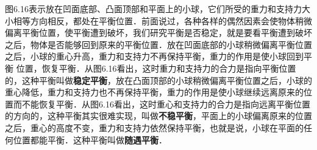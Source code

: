 图6.16表示放在凹面底部、凸面顶部和平面上的小球，它们所受的重力和支持力大小相等方向相反，都处在平衡位置．前面说过，各种各样的偶然因素会使物体稍微偏离平衡位置，使平衡遭到破坏，我们研究平衡是否稳定，就是要看平衡遭到破坏之后，物体是否能够回到原来的平衡位置．放在凹面底部的小球稍微偏离平衡位置之后，小球的重心升高，重力和支持力不再保持平衡，重力的作用是使小球回到平衡
位置，恢复平衡．从图6.16看出，这时重力和支持力的合力是指向平衡位置的，这种平衡叫做\textbf{稳定平衡}，放在凸面顶部的小球稍微偏离平衡位置之后，小球的重心降低，重力和支持力也不再保持平衡，重力的作用是使小球继续远离原来的位置而不能恢复平衡．从图6.16看出，这时重心和支持力的合力是指向远离平衡位置的方向的，这种平衡其实很难实现，叫做\textbf{不稳平衡}，平面上的小球偏离原来的位置之后，重心的高度不变，重力和支持力依然保持平衡，也就是说，小球在平面的任何位置都能平衡．这种平衡叫做\textbf{随遇平衡}．

